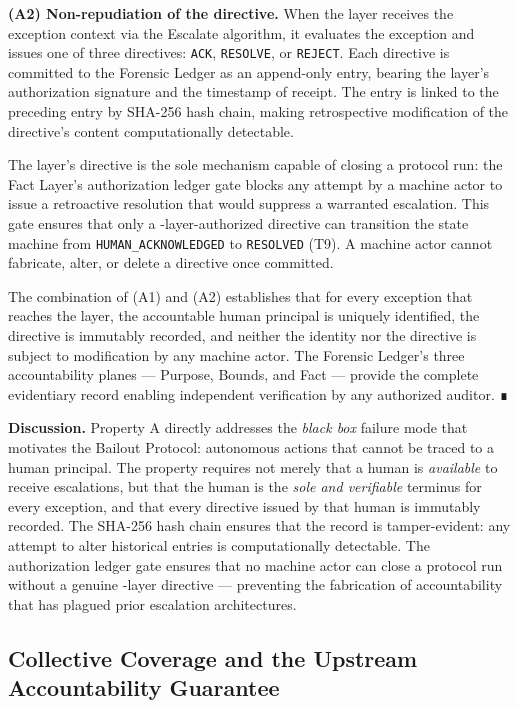 \medskip
\noindent\textbf{(A2) Non-repudiation of the directive.} When the \purpose{} layer receives the exception context via the Escalate algorithm, it evaluates the exception and issues one of three directives: \texttt{ACK}, \texttt{RESOLVE}, or \texttt{REJECT}. Each directive is committed to the Forensic Ledger as an append-only entry, bearing the \purpose{} layer's authorization signature and the timestamp of receipt. The entry is linked to the preceding entry by SHA-256 hash chain, making retrospective modification of the directive's content computationally detectable.

The \purpose{} layer's directive is the sole mechanism capable of closing a protocol run: the Fact Layer's authorization ledger gate blocks any attempt by a machine actor to issue a retroactive resolution that would suppress a warranted escalation. This gate ensures that only a \purpose-layer-authorized directive can transition the state machine from \texttt{HUMAN\_ACKNOWLEDGED} to \texttt{RESOLVED} (T9). A machine actor cannot fabricate, alter, or delete a directive once committed.

The combination of (A1) and (A2) establishes that for every exception that reaches the \purpose{} layer, the accountable human principal is uniquely identified, the directive is immutably recorded, and neither the identity nor the directive is subject to modification by any machine actor. The Forensic Ledger's three accountability planes — Purpose, Bounds, and Fact — provide the complete evidentiary record enabling independent verification by any authorized auditor. ∎

\medskip
\noindent\textbf{Discussion.} Property A directly addresses the \emph{black box} failure mode that motivates the Bailout Protocol: autonomous actions that cannot be traced to a human principal. The property requires not merely that a human is \emph{available} to receive escalations, but that the human is the \emph{sole and verifiable} terminus for every exception, and that every directive issued by that human is immutably recorded. The SHA-256 hash chain ensures that the record is tamper-evident: any attempt to alter historical entries is computationally detectable. The authorization ledger gate ensures that no machine actor can close a protocol run without a genuine \purpose-layer directive — preventing the fabrication of accountability that has plagued prior escalation architectures.

\subsection{Collective Coverage and the Upstream Accountability Guarantee}

